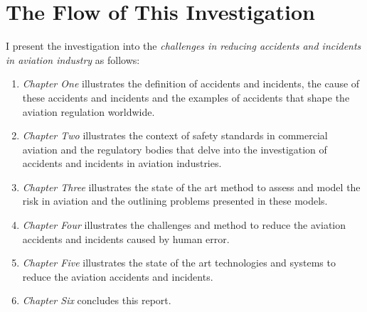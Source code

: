 \documentclass[a4paper,10pt]{article}
\begin{document}
\section{The Flow of This Investigation}
I present the investigation into the \textit{challenges in reducing accidents and incidents in aviation industry} as follows:
\begin{enumerate}
		\item \textit{Chapter One} illustrates the definition of accidents and incidents, the cause of these accidents and incidents and the examples of accidents that shape the aviation regulation worldwide.
		\item \textit{Chapter Two} illustrates the context of safety standards in commercial aviation and the regulatory bodies that delve into the investigation of accidents and incidents in aviation industries.
		\item \textit{Chapter Three} illustrates the state of the art method to assess and model the risk in aviation and the outlining problems presented in these models.
		\item \textit{Chapter Four} illustrates the challenges and method to reduce the aviation accidents and incidents caused by human error.
		\item \textit{Chapter Five} illustrates the state of the art technologies and systems to reduce the aviation accidents and incidents.
		\item \textit{Chapter Six} concludes this report.
\end{enumerate}
\end{document}
